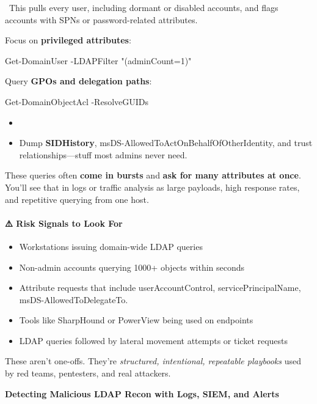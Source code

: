 {{ This pulls every user, including dormant or disabled accounts, and flags accounts with SPNs or password-related attributes.

Focus on \textbf{privileged attributes}:

  

 

Get-DomainUser -LDAPFilter "(adminCount=1)"

Query \textbf{GPOs and delegation paths}:

  

 

Get-DomainObjectAcl -ResolveGUIDs

\begin{itemize}
    \item 

    \item Dump \textbf{SIDHistory}, msDS-AllowedToActOnBehalfOfOtherIdentity, and trust relationships—stuff most admins never need.

\end{itemize}
These queries often \textbf{come in bursts} and \textbf{ask for many attributes at once}. You’ll see that in logs or traffic analysis as large payloads, high response rates, and repetitive querying from one host.

\paragraph{\textbf{⚠️ Risk Signals to Look For}}

\begin{itemize}
    \item Workstations issuing domain-wide LDAP queries
    \item Non-admin accounts querying 1000+ objects within seconds
    \item Attribute requests that include userAccountControl, servicePrincipalName, msDS-AllowedToDelegateTo.
    \item Tools like SharpHound or PowerView being used on endpoints
    \item LDAP queries followed by lateral movement attempts or ticket requests

\end{itemize}
These aren’t one-offs. They’re \textit{structured, intentional, repeatable playbooks} used by red teams, pentesters, and real attackers.

\textbf{Detecting Malicious LDAP Recon with Logs, SIEM, and Alerts}

}}
